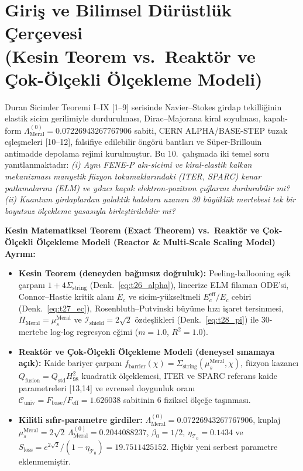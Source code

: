 \documentclass[12pt,a4paper]{article}
\begin{document}
\section[Giriş ve Bilimsel Dürüstlük Çerçevesi]{Giriş ve Bilimsel Dürüstlük Çerçevesi \\ (Kesin Teorem vs.\ Reaktör ve Çok-Ölçekli Ölçekleme Modeli)}

Duran Sicimler Teoremi I--IX [1--9] serisinde Navier--Stokes girdap tekilliğinin elastik sicim gerilimiyle durdurulması, Dirac--Majorana kiral soyulması, kapalı-form $\Lambda_{\mathrm{Meral}}^{(0)} = 0.07226943267767906$ sabiti, CERN ALPHA/BASE-STEP tuzak eşleşmeleri [10--12], falsifiye edilebilir öngörü bantları ve Süper-Brillouin antimadde depolama rejimi kurulmuştur. Bu 10.\ çalışmada iki temel soru yanıtlanmaktadır: \textit{(i) Aynı FENE-P akı-sicimi ve kiral-elastik kalkan mekanizması manyetik füzyon tokamaklarındaki (ITER, SPARC) kenar patlamalarını (ELM) ve yıkıcı kaçak elektron-pozitron çığlarını durdurabilir mi? (ii) Kuantum girdaplardan galaktik halolara uzanan 30 büyüklük mertebesi tek bir boyutsuz ölçekleme yasasıyla birleştirilebilir mi?}

\textbf{Kesin Matematiksel Teorem (Exact Theorem) vs.\ Reaktör ve Çok-Ölçekli Ölçekleme Modeli (Reactor \& Multi-Scale Scaling Model) Ayrımı:}
\begin{itemize}
    \item \textbf{Kesin Teorem (deneyden bağımsız doğruluk):} Peeling-ballooning eşik çarpanı $1+4\Sigma_{\mathrm{string}}$ (Denk.~\ref{eq:t26_alpha}), lineerize ELM filaman ODE'si, Connor--Hastie kritik alanı $E_c$ ve sicim-yükseltmeli $E_c^{\mathrm{eff}}/E_c$ cebiri (Denk.~\ref{eq:t27_ec}), Rosenbluth--Putvinski büyüme hızı işaret tersinmesi, $\Pi_{\mathrm{Meral}} = \mu_s^{\mathrm{Meral}}$ ve $\mathcal{I}_{\mathrm{shield}} = 2\sqrt{2}$ özdeşlikleri (Denk.~\ref{eq:t28_pi}) ile 30-mertebe log-log regresyon eğimi ($m = 1.0$, $R^2=1.0$).
    \item \textbf{Reaktör ve Çok-Ölçekli Ölçekleme Modeli (deneysel sınamaya açık):} Kaide bariyer çarpanı $f_{\mathrm{barrier}}(\chi) = \Sigma_{\mathrm{string}}(\mu_s^{\mathrm{Meral}},\chi)$, füzyon kazancı $Q_{\mathrm{fusion}} = Q_{\mathrm{std}} H_{98}^2$ kuadratik ölçeklemesi, ITER ve SPARC referans kaide parametreleri [13,14] ve evrensel doygunluk oranı $\mathcal{C}_{\mathrm{univ}} = F_{\mathrm{base}}/F_{\mathrm{eff}} = 1.626038$ sabitinin 6 fiziksel ölçeğe taşınması.
    \item \textbf{Kilitli sıfır-parametre girdiler:} $\Lambda_{\mathrm{Meral}}^{(0)} = 0.07226943267767906$, kuplaj $\mu_s^{\mathrm{Meral}} = 2\sqrt{2}\,\Lambda_{\mathrm{Meral}}^{(0)} = 0.2044088237$, $\beta_0 = 1/2$, $\eta_{\mathcal{T}_0} = 0.1434$ ve $S_{\mathrm{loss}} = e^{2\sqrt{2}}/(1-\eta_{\mathcal{T}_0}) = 19.7511425152$. Hiçbir yeni serbest parametre eklenmemiştir.
\end{itemize}
\end{document}
